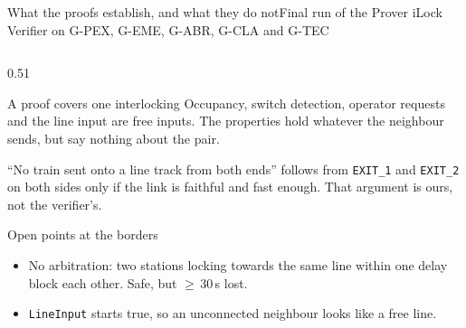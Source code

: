 \documentclass[aspectratio=169,10pt]{beamer}
\newcommand{\smallfont}{\fontsize{7}{8.6}\selectfont}
\begin{document}
\begin{frame}[label=sec_results]{What the proofs establish, and what they do not}{Final run of the Prover iLock Verifier on G-PEX, G-EME, G-ABR, G-CLA and G-TEC}
\begin{columns}[T]
    \begin{column}{0.51\textwidth}
      \begin{proverbox}{A proof covers one interlocking}
        \smallfont
        Occupancy, switch detection, operator requests and the line input are free inputs. The properties hold whatever the neighbour sends, but say nothing about the pair.\par
        \vspace{0.8mm}
        ``No train sent onto a line track from both ends'' follows from \texttt{EXIT\_1} and \texttt{EXIT\_2} on both sides only if the link is faithful and fast enough. That argument is ours, not the verifier's.
      \end{proverbox}
      \vspace{-1mm}
      \begin{proverbox}{Open points at the borders}
        \begin{itemize}\smallfont
          \item No arbitration: two stations locking towards the same line within one delay block each other. Safe, but $\geq$\,30\,s lost.
          \item \texttt{LineInput} starts true, so an unconnected neighbour looks like a free line.
        \end{itemize}
      \end{proverbox}
    \end{column}
  \end{columns}
\end{frame}
\end{document}
